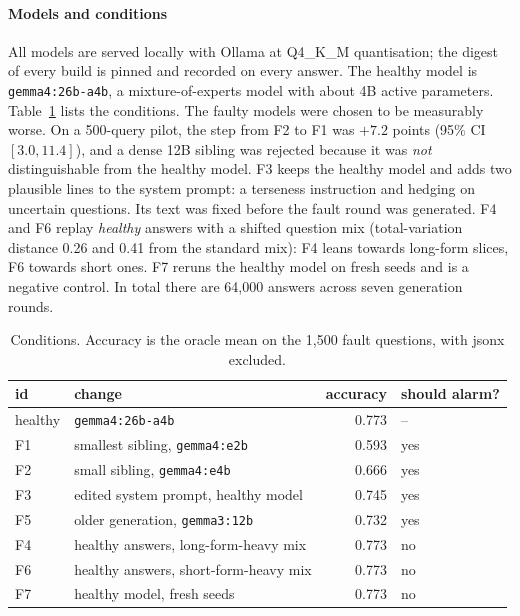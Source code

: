 \documentclass{article}
\begin{document}
\paragraph{Models and conditions}
All models are served locally with Ollama at Q4\_K\_M quantisation; the digest of
every build is pinned and recorded on every answer. The healthy model is
\texttt{gemma4:26b-a4b}, a mixture-of-experts model with about 4B active
parameters. Table~\ref{tab:conditions} lists the conditions. The faulty models
were chosen to be measurably worse. On a 500-query pilot, the step from F2 to F1
was $+7.2$ points (95\% CI $[3.0, 11.4]$), and a dense 12B sibling was rejected
because it was \emph{not} distinguishable from the healthy model. F3 keeps the
healthy model and adds two plausible lines to the system prompt: a terseness
instruction and hedging on uncertain questions. Its text was fixed before the
fault round was generated. F4 and F6 replay \emph{healthy} answers with a shifted
question mix (total-variation distance 0.26 and 0.41 from the standard mix): F4
leans towards long-form slices, F6 towards short ones. F7 reruns the healthy
model on fresh seeds and is a negative control. In total there are 64{,}000
answers across seven generation rounds.

\begin{table}[t]
  \centering\small
  \caption{Conditions. Accuracy is the oracle mean on the 1{,}500 fault questions,
  with \textsf{jsonx} excluded.}
  \label{tab:conditions}
  \begin{tabular}{llrl}
    \toprule
    id & change & accuracy & should alarm? \\
    \midrule
    healthy & \texttt{gemma4:26b-a4b} & 0.773 & -- \\
    F1 & smallest sibling, \texttt{gemma4:e2b} & 0.593 & yes \\
    F2 & small sibling, \texttt{gemma4:e4b} & 0.666 & yes \\
    F3 & edited system prompt, healthy model & 0.745 & yes \\
    F5 & older generation, \texttt{gemma3:12b} & 0.732 & yes \\
    F4 & healthy answers, long-form-heavy mix & 0.773 & no \\
    F6 & healthy answers, short-form-heavy mix & 0.773 & no \\
    F7 & healthy model, fresh seeds & 0.773 & no \\
    \bottomrule
  \end{tabular}
\end{table}
\end{document}
